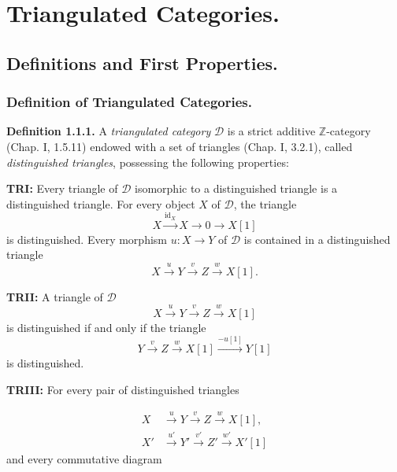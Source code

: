 \chapter{Triangulated Categories.}
%
\begingroup
\small
\setlength{\abovedisplayskip}{4pt plus 2pt minus 2pt}%
\setlength{\belowdisplayskip}{4pt plus 2pt minus 2pt}%

\section{Definitions and First Properties.}

\subsection{Definition of Triangulated Categories.}

\noindent\textbf{Definition 1.1.1.}\quad
A \emph{triangulated category} $\mathcal D$ is a strict additive
$\mathbb Z$-category (Chap. I, 1.5.11) endowed with a set of triangles
(Chap. I, 3.2.1), called \emph{distinguished triangles}, possessing the
following properties:

\smallskip
\noindent\textbf{TRI:}
Every triangle of $\mathcal D$ isomorphic to a distinguished triangle is a
distinguished triangle. For every object $X$ of $\mathcal D$, the triangle
\[
  X\xrightarrow{\operatorname{id}_X}X\longrightarrow 0
  \longrightarrow X[1]
\]
is distinguished. Every morphism $u\colon X\longrightarrow Y$ of
$\mathcal D$ is contained in a distinguished triangle
\[
  X\xrightarrow{u}Y\xrightarrow{v}Z\xrightarrow{w}X[1].
\]

\noindent\textbf{TRII:}
A triangle of $\mathcal D$
\[
  X\xrightarrow{u}Y\xrightarrow{v}Z\xrightarrow{w}X[1]
\]
is distinguished if and only if the triangle
\[
  Y\xrightarrow{v}Z\xrightarrow{w}X[1]
  \xrightarrow{-u[1]}Y[1]
\]
is distinguished.

\noindent\textbf{TRIII:}
For every pair of distinguished triangles

\[
  \begin{aligned}
    X  &\xrightarrow{u}  Y  \xrightarrow{v}  Z  \xrightarrow{w}  X[1],\\
    X' &\xrightarrow{u'} Y' \xrightarrow{v'} Z' \xrightarrow{w'} X'[1]
  \end{aligned}
\]
and every commutative diagram

\begin{center}
\end{center}
\endgroup
